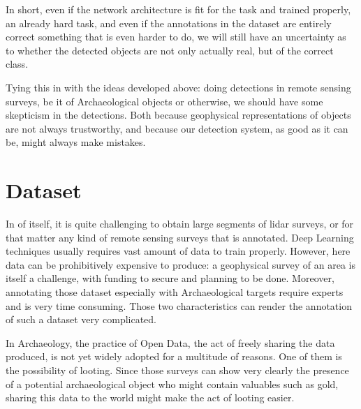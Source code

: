 In short, even if the network architecture is fit for the task and trained properly, an already hard task, and even if the annotations in the dataset are entirely correct something that is even harder to do, we will still have an uncertainty as to whether the detected objects are not only actually real, but of the correct class. 

Tying this in with the ideas developed above: doing detections in remote sensing surveys, be it of Archaeological objects or otherwise, we should have some skepticism in the detections. Both because geophysical representations of objects are not always trustworthy, and because our detection system, as good as it can be, might always make mistakes.

\section{Dataset}\label{diffDataset}
In of itself, it is quite challenging to obtain large segments of \gls{lidar} surveys, or for that matter any kind of remote sensing surveys that is annotated. Deep Learning techniques usually requires vast amount of data to train properly. However, here  data can be prohibitively expensive to produce: a geophysical survey of an area is itself a challenge, with funding to secure and planning to be done. Moreover, annotating those dataset especially with Archaeological targets require experts and is very time consuming. Those two characteristics can render the annotation of such a dataset very complicated.\cite{kokaljHesse2017}

In Archaeology, the practice of Open Data, the act of freely sharing the data produced, is not yet widely adopted for a multitude of reasons. One of them is the possibility of looting. Since those surveys can show very clearly the presence of a potential archaeological object who might contain valuables such as gold, sharing this data to the world might make the act of looting easier\cite{optizHerr2018}.  

